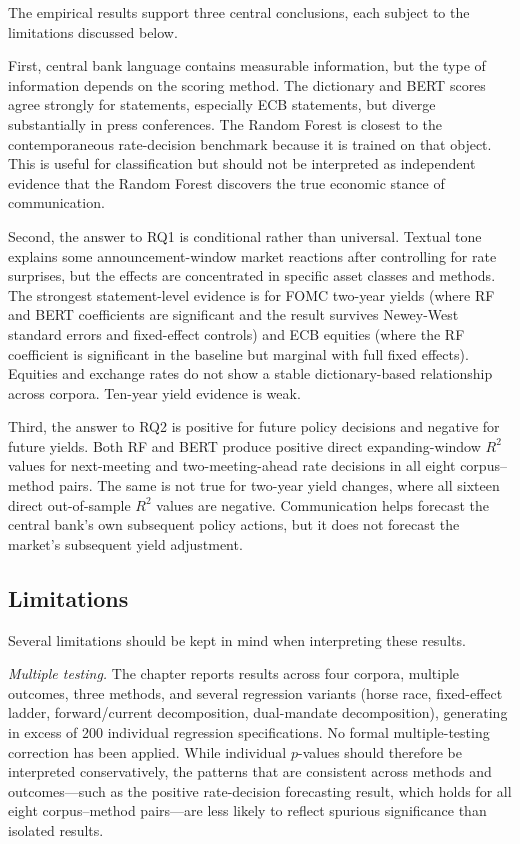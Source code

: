 The empirical results support three central conclusions, each subject to the
limitations discussed below.

First, central bank language contains measurable information, but the type of
information depends on the scoring method. The dictionary and BERT
scores agree strongly for statements, especially ECB statements, but diverge
substantially in press conferences. The Random Forest is closest to the
contemporaneous rate-decision benchmark because it is trained on that object.
This is useful for classification but should not be interpreted as independent
evidence that the Random Forest discovers the true economic stance of
communication.

Second, the answer to RQ1 is conditional rather than universal. Textual tone
explains some announcement-window market reactions after controlling for rate
surprises, but the effects are concentrated in specific asset classes and
methods. The strongest statement-level evidence is for FOMC two-year yields
(where RF and BERT coefficients are significant and the result survives
Newey-West standard errors and fixed-effect controls) and ECB equities (where
the RF coefficient is significant in the baseline but marginal with full fixed
effects). Equities and exchange rates do not show a stable dictionary-based
relationship across corpora. Ten-year yield evidence is weak.

Third, the answer to RQ2 is positive for future policy decisions and negative
for future yields. Both RF and BERT produce positive direct expanding-window
$R^2$ values for next-meeting and two-meeting-ahead rate decisions in all eight
corpus--method pairs. The same is not true for two-year yield changes, where
all sixteen direct out-of-sample $R^2$ values are negative. Communication
helps forecast the central bank's own subsequent policy actions, but it does
not forecast the market's subsequent yield adjustment.

\subsection*{Limitations}

Several limitations should be kept in mind when interpreting these results.

\emph{Multiple testing.} The chapter reports results across four corpora,
multiple outcomes, three methods, and several regression variants (horse race,
fixed-effect ladder, forward/current decomposition, dual-mandate
decomposition), generating in excess of 200 individual regression
specifications. No formal multiple-testing correction has been applied. While
individual $p$-values should therefore be interpreted conservatively, the
patterns that are consistent across methods and outcomes---such as the positive
rate-decision forecasting result, which holds for all eight corpus--method
pairs---are less likely to reflect spurious significance than isolated results.

